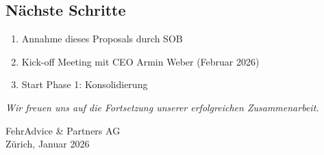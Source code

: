 \documentclass{fehradvice-report}
\begin{document}
\subsection{Nächste Schritte}

\begin{enumerate}
    \item Annahme dieses Proposals durch SOB
    \item Kick-off Meeting mit CEO Armin Weber (Februar 2026)
    \item Start Phase 1: Konsolidierung
\end{enumerate}

\vspace{1cm}

\begin{center}
\textit{Wir freuen uns auf die Fortsetzung unserer erfolgreichen Zusammenarbeit.}
\end{center}

\vspace{2cm}

\begin{flushright}
FehrAdvice \& Partners AG\\
Zürich, Januar 2026
\end{flushright}
\end{document}
